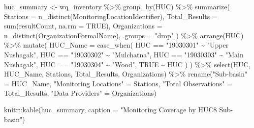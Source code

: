 \documentclass[
  letterpaper,
]{scrbook}
\newenvironment{Shaded}{\begin{snugshade}}{\end{snugshade}}
\newcommand{\AttributeTok}[1]{\textcolor[rgb]{0.40,0.45,0.13}{#1}}
\newcommand{\ConstantTok}[1]{\textcolor[rgb]{0.56,0.35,0.01}{#1}}
\newcommand{\FunctionTok}[1]{\textcolor[rgb]{0.28,0.35,0.67}{#1}}
\newcommand{\NormalTok}[1]{\textcolor[rgb]{0.00,0.23,0.31}{#1}}
\newcommand{\OtherTok}[1]{\textcolor[rgb]{0.00,0.23,0.31}{#1}}
\newcommand{\SpecialCharTok}[1]{\textcolor[rgb]{0.37,0.37,0.37}{#1}}
\newcommand{\StringTok}[1]{\textcolor[rgb]{0.13,0.47,0.30}{#1}}
\begin{document}
\begin{Shaded}
\begin{Highlighting}[]
\NormalTok{huc\_summary }\OtherTok{\textless{}{-}}\NormalTok{ wq\_inventory }\SpecialCharTok{\%\textgreater{}\%}
  \FunctionTok{group\_by}\NormalTok{(HUC) }\SpecialCharTok{\%\textgreater{}\%}
  \FunctionTok{summarize}\NormalTok{(}
    \AttributeTok{Stations =} \FunctionTok{n\_distinct}\NormalTok{(MonitoringLocationIdentifier),}
    \AttributeTok{Total\_Results =} \FunctionTok{sum}\NormalTok{(resultCount, }\AttributeTok{na.rm =} \ConstantTok{TRUE}\NormalTok{),}
    \AttributeTok{Organizations =} \FunctionTok{n\_distinct}\NormalTok{(OrganizationFormalName),}
    \AttributeTok{.groups =} \StringTok{"drop"}
\NormalTok{  ) }\SpecialCharTok{\%\textgreater{}\%}
  \FunctionTok{arrange}\NormalTok{(HUC) }\SpecialCharTok{\%\textgreater{}\%}
  \FunctionTok{mutate}\NormalTok{(}
    \AttributeTok{HUC\_Name =} \FunctionTok{case\_when}\NormalTok{(}
\NormalTok{      HUC }\SpecialCharTok{==} \StringTok{"19030301"} \SpecialCharTok{\textasciitilde{}} \StringTok{"Upper Nushagak"}\NormalTok{,}
\NormalTok{      HUC }\SpecialCharTok{==} \StringTok{"19030302"} \SpecialCharTok{\textasciitilde{}} \StringTok{"Mulchatna"}\NormalTok{,}
\NormalTok{      HUC }\SpecialCharTok{==} \StringTok{"19030303"} \SpecialCharTok{\textasciitilde{}} \StringTok{"Main Nushagak"}\NormalTok{,}
\NormalTok{      HUC }\SpecialCharTok{==} \StringTok{"19030304"} \SpecialCharTok{\textasciitilde{}} \StringTok{"Wood"}\NormalTok{,}
      \ConstantTok{TRUE} \SpecialCharTok{\textasciitilde{}}\NormalTok{ HUC}
\NormalTok{    )}
\NormalTok{  ) }\SpecialCharTok{\%\textgreater{}\%}
  \FunctionTok{select}\NormalTok{(HUC, HUC\_Name, Stations, Total\_Results, Organizations) }\SpecialCharTok{\%\textgreater{}\%}
  \FunctionTok{rename}\NormalTok{(}\StringTok{"Sub{-}basin"} \OtherTok{=}\NormalTok{ HUC\_Name, }\StringTok{"Monitoring Locations"} \OtherTok{=}\NormalTok{ Stations, }\StringTok{"Total Observations"} \OtherTok{=}\NormalTok{ Total\_Results, }\StringTok{"Data Providers"} \OtherTok{=}\NormalTok{ Organizations)}

\NormalTok{knitr}\SpecialCharTok{::}\FunctionTok{kable}\NormalTok{(huc\_summary, }\AttributeTok{caption =} \StringTok{"Monitoring Coverage by HUC8 Sub{-}basin"}\NormalTok{)}
\end{Highlighting}
\end{Shaded}
\end{document}
